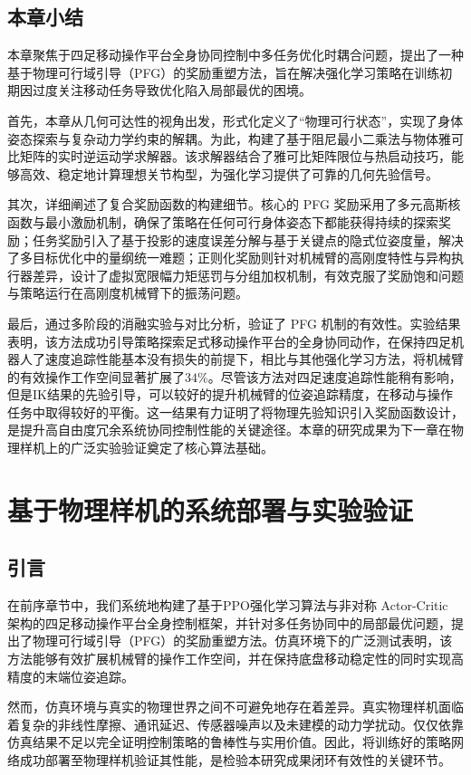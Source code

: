 \section{本章小结}
本章聚焦于四足移动操作平台全身协同控制中多任务优化时耦合问题，提出了一种基于物理可行域引导（PFG）的奖励重塑方法，旨在解决强化学习策略在训练初期因过度关注移动任务导致优化陷入局部最优的困境。

首先，本章从几何可达性的视角出发，形式化定义了“物理可行状态”，实现了身体姿态探索与复杂动力学约束的解耦。为此，构建了基于阻尼最小二乘法与物体雅可比矩阵的实时逆运动学求解器。该求解器结合了雅可比矩阵限位与热启动技巧，能够高效、稳定地计算理想关节构型，为强化学习提供了可靠的几何先验信号。

其次，详细阐述了复合奖励函数的构建细节。核心的 PFG 奖励采用了多元高斯核函数与最小激励机制，确保了策略在任何可行身体姿态下都能获得持续的探索奖励；任务奖励引入了基于投影的速度误差分解与基于关键点的隐式位姿度量，解决了多目标优化中的量纲统一难题；正则化奖励则针对机械臂的高刚度特性与异构执行器差异，设计了虚拟宽限幅力矩惩罚与分组加权机制，有效克服了奖励饱和问题与策略运行在高刚度机械臂下的振荡问题。

最后，通过多阶段的消融实验与对比分析，验证了 PFG 机制的有效性。实验结果表明，该方法成功引导策略探索足式移动操作平台的全身协同动作，在保持四足机器人了速度追踪性能基本没有损失的前提下，相比与其他强化学习方法，将机械臂的有效操作工作空间显著扩展了$34\%$。尽管该方法对四足速度追踪性能稍有影响，但是IK结果的先验引导，可以较好的提升机械臂的位姿追踪精度，在移动与操作任务中取得较好的平衡。这一结果有力证明了将物理先验知识引入奖励函数设计，是提升高自由度冗余系统协同控制性能的关键途径。本章的研究成果为下一章在物理样机上的广泛实验验证奠定了核心算法基础。

\chapter{基于物理样机的系统部署与实验验证}
\label{chap:real_world_exp}

\section{引言}

在前序章节中，我们系统地构建了基于PPO强化学习算法与非对称 Actor-Critic 架构的四足移动操作平台全身控制框架，并针对多任务协同中的局部最优问题，提出了物理可行域引导（PFG）的奖励重塑方法。仿真环境下的广泛测试表明，该方法能够有效扩展机械臂的操作工作空间，并在保持底盘移动稳定性的同时实现高精度的末端位姿追踪。

然而，仿真环境与真实的物理世界之间不可避免地存在着差异。真实物理样机面临着复杂的非线性摩擦、通讯延迟、传感器噪声以及未建模的动力学扰动。仅仅依靠仿真结果不足以完全证明控制策略的鲁棒性与实用价值。因此，将训练好的策略网络成功部署至物理样机验证其性能，是检验本研究成果闭环有效性的关键环节。

